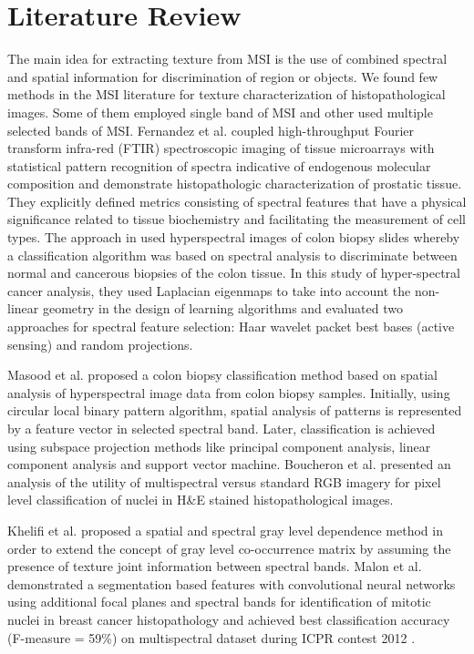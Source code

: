 \documentclass[10pt,twocolumn,letterpaper]{article}
\begin{document}
\section{Literature Review}
\label{sec:previous}

The main idea for extracting texture from MSI is the use of combined spectral and spatial information for discrimination of region or objects. We found few methods in the MSI literature for texture characterization of histopathological images. Some of them employed single band of MSI and other used multiple selected bands of MSI. Fernandez et al. \cite{fernandez2005} coupled high-throughput Fourier transform infra-red (FTIR) spectroscopic imaging of tissue microarrays with statistical pattern recognition of spectra indicative of endogenous molecular composition and demonstrate histopathologic characterization of prostatic tissue. They explicitly defined metrics consisting of spectral features that have a physical significance related to tissue biochemistry and facilitating the measurement of cell types. The approach in \cite{woolfe2006} used hyperspectral images of colon biopsy slides whereby a classification algorithm was based on spectral analysis to discriminate between normal and cancerous biopsies of the colon tissue. In this study of hyper-spectral cancer analysis, they used Laplacian eigenmaps to take into account the non-linear geometry in the design of learning algorithms and evaluated two approaches for spectral feature selection: Haar wavelet packet best bases (active sensing) and random projections.

Masood et al. \cite{masood2009} proposed a colon biopsy classification method based on spatial analysis of hyperspectral image data from colon biopsy samples. Initially, using circular local binary pattern algorithm, spatial analysis of patterns is represented by a feature vector in selected spectral band. Later, classification is achieved using subspace projection methods like principal component analysis, linear component analysis and support vector machine. Boucheron et al. \cite{boucheron2007} presented an analysis of the utility of multispectral versus standard RGB imagery for pixel level classification of nuclei in H\&E stained histopathological images. 

Khelifi et al. \cite{khelifi2012} proposed a spatial and spectral gray level dependence method in order to extend the concept of gray level co-occurrence matrix by assuming the presence of texture joint information between spectral bands. Malon et al. \cite{malon2013} demonstrated a segmentation based features with convolutional neural networks using additional focal planes and spectral bands for identification of mitotic nuclei in breast cancer histopathology and achieved best classification accuracy (F-measure = 59\%) on multispectral dataset during ICPR contest 2012 \cite{roux2013}.
\end{document}
